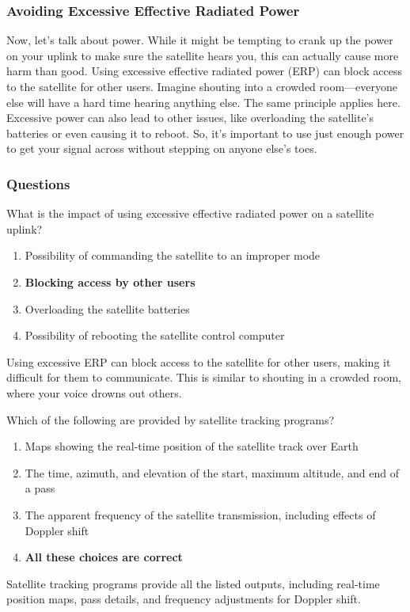 \subsubsection*{Avoiding Excessive Effective Radiated Power}
Now, let's talk about power. While it might be tempting to crank up the power on your uplink to make sure the satellite hears you, this can actually cause more harm than good. Using excessive effective radiated power (ERP) can block access to the satellite for other users. Imagine shouting into a crowded room—everyone else will have a hard time hearing anything else. The same principle applies here. Excessive power can also lead to other issues, like overloading the satellite's batteries or even causing it to reboot. So, it's important to use just enough power to get your signal across without stepping on anyone else's toes.

\subsubsection{Questions}

\begin{tcolorbox}[colback=gray!10!white,colframe=black!75!black,title={T8B02}]
What is the impact of using excessive effective radiated power on a satellite uplink?
\begin{enumerate}[label=\Alph*),noitemsep]
    \item Possibility of commanding the satellite to an improper mode
    \item \textbf{Blocking access by other users}
    \item Overloading the satellite batteries
    \item Possibility of rebooting the satellite control computer
\end{enumerate}
\end{tcolorbox}
Using excessive ERP can block access to the satellite for other users, making it difficult for them to communicate. This is similar to shouting in a crowded room, where your voice drowns out others.

\begin{tcolorbox}[colback=gray!10!white,colframe=black!75!black,title={T8B03}]
Which of the following are provided by satellite tracking programs?
\begin{enumerate}[label=\Alph*),noitemsep]
    \item Maps showing the real-time position of the satellite track over Earth
    \item The time, azimuth, and elevation of the start, maximum altitude, and end of a pass
    \item The apparent frequency of the satellite transmission, including effects of Doppler shift
    \item \textbf{All these choices are correct}
\end{enumerate}
\end{tcolorbox}
Satellite tracking programs provide all the listed outputs, including real-time position maps, pass details, and frequency adjustments for Doppler shift.

